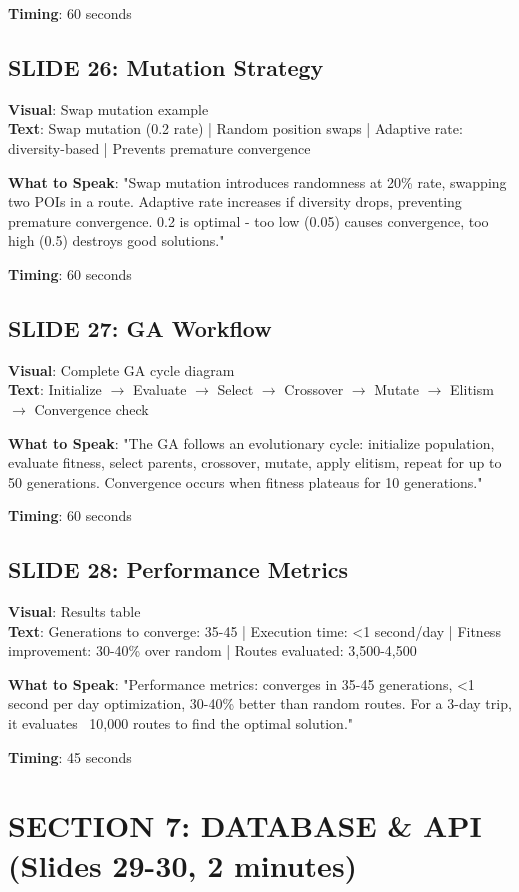 \documentclass[12pt]{article}
\begin{document}
\textbf{Timing}: 60 seconds

\subsection{SLIDE 26: Mutation Strategy}
\textbf{Visual}: Swap mutation example \\
\textbf{Text}: Swap mutation (0.2 rate) | Random position swaps | Adaptive rate: diversity-based | Prevents premature convergence

\textbf{What to Speak}:
"Swap mutation introduces randomness at 20\% rate, swapping two POIs in a route. Adaptive rate increases if diversity drops, preventing premature convergence. 0.2 is optimal - too low (0.05) causes convergence, too high (0.5) destroys good solutions."

\textbf{Timing}: 60 seconds

\subsection{SLIDE 27: GA Workflow}
\textbf{Visual}: Complete GA cycle diagram \\
\textbf{Text}: Initialize $\rightarrow$ Evaluate $\rightarrow$ Select $\rightarrow$ Crossover $\rightarrow$ Mutate $\rightarrow$ Elitism $\rightarrow$ Convergence check

\textbf{What to Speak}:
"The GA follows an evolutionary cycle: initialize population, evaluate fitness, select parents, crossover, mutate, apply elitism, repeat for up to 50 generations. Convergence occurs when fitness plateaus for 10 generations."

\textbf{Timing}: 60 seconds

\subsection{SLIDE 28: Performance Metrics}
\textbf{Visual}: Results table \\
\textbf{Text}: Generations to converge: 35-45 | Execution time: <1 second/day | Fitness improvement: 30-40\% over random | Routes evaluated: 3,500-4,500

\textbf{What to Speak}:
"Performance metrics: converges in 35-45 generations, <1 second per day optimization, 30-40\% better than random routes. For a 3-day trip, it evaluates ~10,000 routes to find the optimal solution."

\textbf{Timing}: 45 seconds

\section{SECTION 7: DATABASE \& API (Slides 29-30, 2 minutes)}
\end{document}
